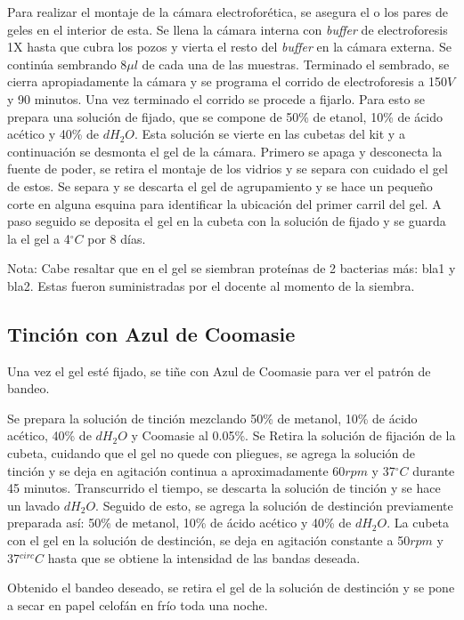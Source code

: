 \documentclass[%
 reprint,
 amsmath,amssymb,
 aps,
showkeys
]{revtex4-1}
\begin{document}
		Para realizar el montaje de la cámara electroforética, se asegura el o los pares de geles en el interior de esta. Se llena la cámara interna con \textit{buffer} de electroforesis 1X hasta que cubra los pozos y vierta el resto del \textit{buffer} en la cámara externa. Se continúa sembrando 8$\mu l$ de cada una de las muestras. Terminado el sembrado, se cierra apropiadamente la cámara y se programa el corrido de electroforesis a 150$V$ y 90 minutos. Una vez terminado el corrido se procede a fijarlo. Para esto se prepara una solución de fijado, que se compone de 50\% de etanol, 10\% de ácido acético y 40\% de $dH_2O$. Esta solución se vierte en las cubetas del kit y a continuación se desmonta el gel de la cámara. Primero se apaga y desconecta la fuente de poder, se retira el montaje de los vidrios y se separa con cuidado el gel de estos. Se separa y se descarta el gel de agrupamiento y se hace un pequeño corte en alguna esquina para identificar la ubicación del primer carril del gel. A paso seguido se deposita el gel en la cubeta con la solución de fijado y se guarda la el gel a 4$^{\circ}C$ por 8 días.

		Nota: Cabe resaltar que en el gel se siembran proteínas de 2 bacterias más: bla1 y bla2. Estas fueron suministradas por el docente al momento de la siembra.
		
	\subsection{\label{sec:TinMet}Tinción con Azul de Coomasie}	
		Una vez el gel esté fijado, se tiñe con Azul de Coomasie para ver el patrón de bandeo.
		
		Se prepara la solución de tinción mezclando 50\% de metanol, 10\% de ácido acético, 40\% de $dH_2O$ y Coomasie al 0.05\%. Se Retira la solución de fijación de la cubeta, cuidando que el gel no quede con pliegues, se agrega la solución de tinción y se deja en agitación continua a aproximadamente 60$rpm$ y 37$^{\circ}C$ durante 45 minutos. Transcurrido el tiempo, se descarta la solución de tinción y se hace un lavado $dH_2O$. Seguido de esto, se agrega la solución de destinción previamente preparada así: 50\% de metanol, 10\% de ácido acético y 40\% de $dH_2O$. La cubeta con el gel en la solución de destinción, se deja en agitación constante a 50$rpm$ y 37$^{circ}C$ hasta que se obtiene la intensidad de las bandas deseada.
		
		Obtenido el bandeo deseado, se retira el gel de la solución de destinción y se pone a secar en papel celofán en frío toda una noche.
		
\end{document}
